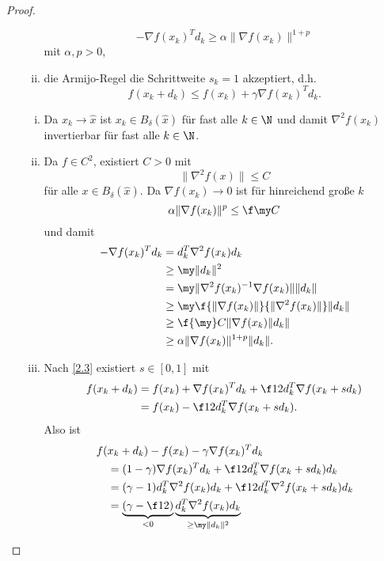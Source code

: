 \begin{st}
\begin{proof}
\begin{enumerate}[(a)]
\begin{enumerate}[(i)]
						\[
							-\nabla f(x_k)^T d_k
							\ge \alpha \|\nabla f(x_k)\|^{1 + p}
						\]
						mit $\alpha, p > 0$,
					\item
						die Armijo-Regel die Schrittweite $s_k = 1$ akzeptiert, d.h.
						\[
							f(x_k + d_k)
							\le f(x_k) + \gamma \nabla f(x_k)^T d_k.
						\]
				\end{enumerate}
				\begin{enumerate}[(i)]
					\item
						Da $x_k \to \hat x$ ist $x_k \in B_\delta (\hat x)$ für fast alle $k \in \N$ und damit $\nabla^2 f(x_k)$ invertierbar für fast alle $k \in \N$.
					\item
						Da $f \in C^2$, existiert $C > 0$ mit
						\[
							\|\nabla^2 f(x) \| \le C
						\]
						für alle $x \in B_\delta(\hat x)$.
						Da $\nabla f(x_k) \to 0$ ist für hinreichend große $k$
						\[
							\alpha \|\nabla f(x_k)\|^p
							\le \f \my C
						\]
						und damit
						\begin{align*}
							-\nabla f(x_k)^T d_k
							&= d_k^T \nabla^2 f(x_k) d_k \\
							&\ge \my \|d_k\|^2 \\
							&= \my \|\nabla^2 f(x_k)^{-1} \nabla f(x_k)\| \|d_k\| \\
							&\ge \my \f{\|\nabla f(x_k)\|}{\|\nabla^2 f(x_k)\|} \|d_k\| \\
							&\ge \f{\my}C \|\nabla f(x_k) \|d_k\| \\
							&\ge \alpha \|\nabla f(x_k)\|^{1+ p} \|d_k\|.
						\end{align*}
					\item
						Nach \ref{2.3} existiert $s \in [0,1]$ mit
						\begin{align*}
							f(x_k + d_k)
							&= f(x_k) + \nabla f(x_k)^T d_k + \f 12 d_k^T \nabla f(x_k + s d_k) \\
							&= f(x_k) - \f 12 d_k^T \nabla f(x_k + s d_k).
						\end{align*}
						Also ist
						\begin{align*}
							&f(x_k + d_k) - f(x_k) - \gamma \nabla f(x_k)^T d_k \\
							&\quad= (1-\gamma) \nabla f(x_k)^T d_k + \f 12 d_k^T \nabla f(x_k + sd_k) d_k \\
							&\quad= (\gamma-1) d_k^T \nabla^2 f(x_k) d_k + \f 12 d_k^T \nabla^2 f(x_k + sd_k) d_k \\
							&\quad= \underbrace{(\gamma-\f 12)}_{<0} \underbrace{d_k^T \nabla^2 f(x_k) d_k}_{\ge \my \|d_k\|^2} \\

\end{align*}
\end{enumerate}
\end{enumerate}
\end{proof}
\end{st}
